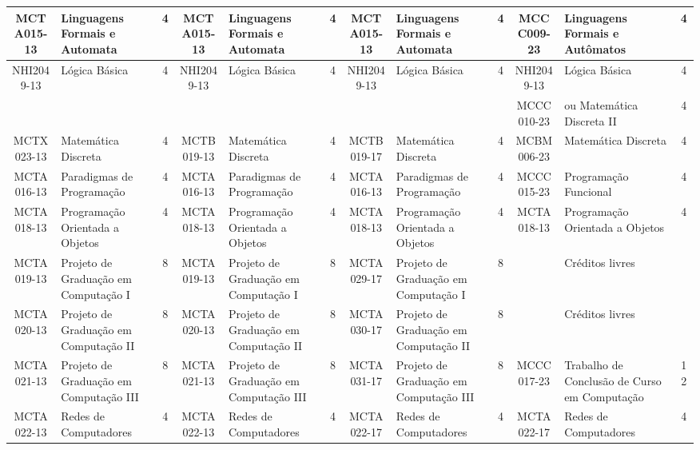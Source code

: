 \documentclass[a4paper]{article}
\begin{document}
\begin{landscape}
{\begin{longtable}{|c|p{.2\textheight}|c||c|p{.2\textheight}|c||c|p{.2\textheight}|c||c|p{.2\textheight}|c|}
    MCTA015-13 & Linguagens Formais e Automata & 4 &
    MCTA015-13 & Linguagens Formais e Automata & 4 &
    MCTA015-13 & Linguagens Formais e Automata & 4 & 
    MCCC009-23 & Linguagens Formais e Autômatos & 4 \\ \hline

    NHI2049-13 & Lógica Básica & 4 &
    NHI2049-13 & Lógica Básica & 4 &
    NHI2049-13 & Lógica Básica & 4 &
    NHI2049-13 & Lógica Básica & 4 \\

    & & &
    & & &
    & & &
    MCCC010-23 & ou Matemática Discreta II & 4 \\ \hline

    MCTX023-13 & Matemática Discreta & 4 & 
    MCTB019-13 & Matemática Discreta & 4 &
    MCTB019-17 & Matemática Discreta & 4 &
    MCBM006-23 & Matemática Discreta & 4 \\ \hline

    MCTA016-13 & Paradigmas de Programação & 4 &
    MCTA016-13 & Paradigmas de Programação & 4 & 
    MCTA016-13 & Paradigmas de Programação & 4 &
    MCCC015-23 & Programação Funcional & 4 \\ \hline

    MCTA018-13 & Programação Orientada a Objetos & 4 &
    MCTA018-13 & Programação Orientada a Objetos & 4 & 
    MCTA018-13 & Programação Orientada a Objetos & 4 &
    MCTA018-13 & Programação Orientada a Objetos & 4 \\ \hline

    MCTA019-13 & Projeto de Graduação em Computação I & 8 &
    MCTA019-13 & Projeto de Graduação em Computação I & 8 &
    MCTA029-17 & Projeto de Graduação em Computação I & 8 &
               & Créditos livres &  \\ \hline

    MCTA020-13 & Projeto de Graduação em Computação II & 8 &
    MCTA020-13 & Projeto de Graduação em Computação II & 8 &
    MCTA030-17 & Projeto de Graduação em Computação II & 8 & 
               & Créditos livres &  \\ \hline

    MCTA021-13 & Projeto de Graduação em Computação III & 8 &
    MCTA021-13 & Projeto de Graduação em Computação III & 8 & 
    MCTA031-17 & Projeto de Graduação em Computação III & 8 &
    MCCC017-23 & Trabalho de Conclusão de Curso em Computação & 12  \\ \hline

    MCTA022-13 & Redes de Computadores & 4 & 
    MCTA022-13 & Redes de Computadores & 4 &
    MCTA022-17 & Redes de Computadores & 4 & 
    MCTA022-17 & Redes de Computadores & 4 \\ \hline


\end{longtable}}
\end{landscape}
\end{document}

